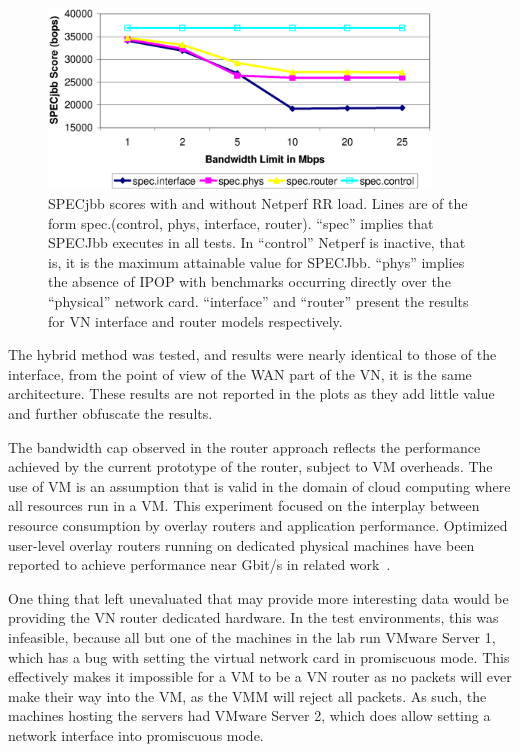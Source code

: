 \begin{figure}
\centering
\includegraphics[width=4in]{figs/rr.spec.jpg.eps}
\caption[Grid SPECjbb evaluation, RR load]{SPECjbb scores with and without
Netperf RR load.  Lines are of the form spec.(control, phys, interface,
router).  ``spec'' implies that SPECJbb executes in all tests.  In ``control''
Netperf is inactive, that is, it is the maximum attainable value for SPECJbb.
``phys'' implies the absence of IPOP with benchmarks occurring directly over
the ``physical'' network card.  ``interface'' and ``router'' present the
results for VN interface and router models respectively.}
\label{fig:rr.spec}
\end{figure}

The hybrid method was tested, and results were nearly identical to those of the
interface, from the point of view of the WAN part of the VN, it is the same
architecture.  These results are not reported in the plots as they add little
value and further obfuscate the results.

The bandwidth cap observed in the router approach reflects the performance
achieved by the current prototype of the router, subject to VM overheads. The
use of VM is an assumption that is valid in the domain of cloud computing where
all resources run in a VM. This experiment focused on the interplay between
resource consumption by overlay routers and application performance.  Optimized
user-level overlay routers running on dedicated physical machines have been
reported to achieve performance near Gbit/s in related work~\cite{vine2}.

One thing that left unevaluated that may provide more interesting data would be
providing the VN router dedicated hardware.  In the test environments, this was
infeasible, because all but one of the machines in the lab run VMware Server 1,
which has a bug with setting the virtual network card in promiscuous mode.
This effectively makes it impossible for a VM to be a VN router as no packets
will ever make their way into the VM, as the VMM will reject all packets.  As
such, the machines hosting the servers had VMware Server 2, which does allow
setting a network interface into promiscuous mode.

